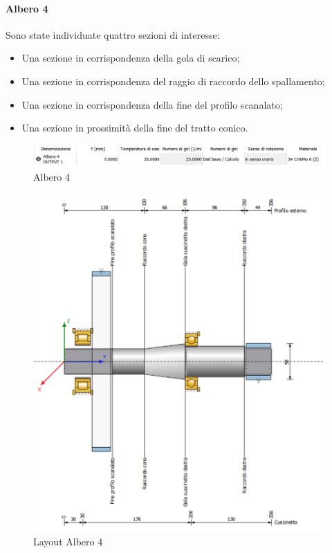 \paragraph{Albero 4}
Sono state individuate quattro sezioni di interesse:
\begin{itemize}
    \item Una sezione in corrispondenza della gola di scarico;
    \item Una sezione in corrispondenza del raggio di raccordo dello spallamento;
    \item Una sezione in corrispondenza della fine del profilo scanalato;
    \item Una sezione in prossimità della fine del tratto conico. 
\end{itemize}
\begin{figure}[h]
    \centering
    \includegraphics[scale=0.4]{Immagini/DatiAlbero4.png}
    \caption{Albero  4}
    \label{fig:DatiAlbero4}
\end{figure}


\newpage
\begin{figure}[h]
    \centering
    \includegraphics[scale=0.5]{Immagini/Albero4.png}
    \caption{Layout Albero 4}
    \label{fig:Albero4}
\end{figure}
\newpage

